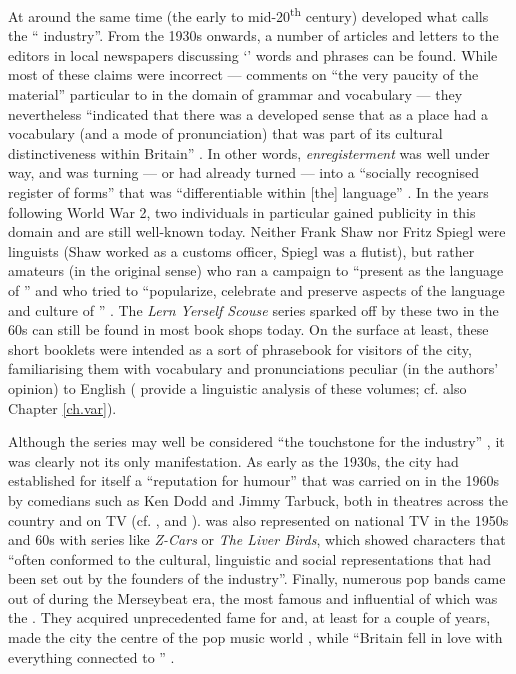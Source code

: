 At around the same time (the early to mid-20\textsuperscript{th} century) developed what \citet[40]{crowley2012} calls the `` industry''.
From the 1930s onwards, a number of articles and letters to the editors in local newspapers discussing `' words and phrases can be found.
While most of these claims were incorrect --- \citet[48]{knowles1973} comments on ``the very paucity of the material'' particular to  in the domain of grammar and vocabulary --- they nevertheless ``indicated that there was a developed sense that  as a place had a vocabulary (and a mode of pronunciation) that was part of its cultural distinctiveness within Britain'' \parencite[42]{crowley2012}.
In other words, \emph{enregisterment} was well under way, and  was turning --- or had already turned --- into a ``socially recognised register of forms'' that was ``differentiable within [the] language'' \parencite[231]{agha2003}.
In the years following World War 2, two individuals in particular gained publicity in this domain and are still well-known today.
Neither Frank Shaw nor Fritz Spiegl were linguists (Shaw worked as a customs officer, Spiegl was a flutist), but rather amateurs (in the original sense) who ran a campaign to ``present  as the language of '' and who tried to ``popularize, celebrate and preserve aspects of the language and culture of '' \citep[64--65]{crowley2012}.
The \emph{Lern Yerself Scouse} series sparked off by these two in the 60s can still be found in most  book shops today.
On the surface at least, these short booklets were intended as a sort of phrasebook for visitors of the city, familiarising them with vocabulary and pronunciations peculiar (in the authors' opinion) to  English (\citet{honeybonewatson2013} provide a linguistic analysis of these volumes; cf. also Chapter \ref{ch.var}).

Although the series may well be considered ``the touchstone for the  industry'' \citep[79]{crowley2012}, it was clearly not its only manifestation.
As early as the 1930s, the city had established for itself a ``reputation for humour'' that was carried on in the 1960s by comedians such as Ken Dodd and Jimmy Tarbuck, both in theatres across the country and on TV (cf. \citealt[423]{murden2006}, and \citealp[49]{belchem2006a}).
 was also represented on national TV in the 1950s and 60s with series like \emph{Z-Cars} or \emph{The Liver Birds}, which showed characters that ``often conformed to the cultural, linguistic and social representations that had been set out by the founders of the  industry''.
Finally, numerous pop bands came out of  during the Merseybeat era, the most famous and influential of which was the . They acquired unprecedented fame for  and, at least for a couple of years, made the city the centre of the pop music world \citep[cf.][75]{crowley2012}, while ``Britain fell in love with everything connected to '' \citep[423]{murden2006}.

